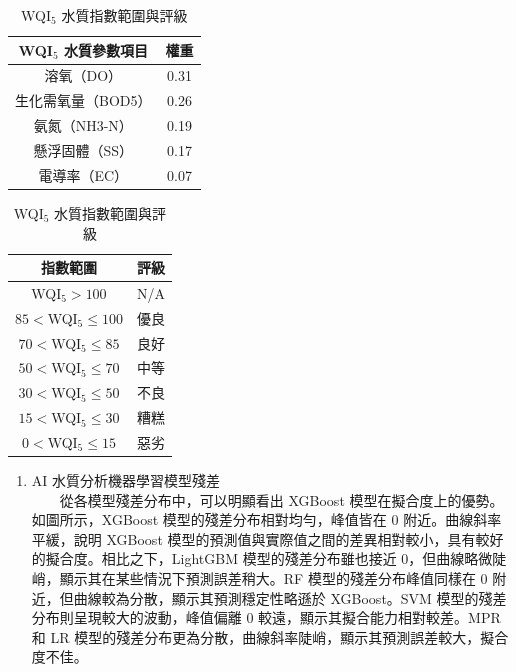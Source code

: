 \documentclass[12pt,a4paper]{article}
\begin{document}
\begin{enumerate}
\begin{enumerate}[label=\arabic*.]
\begin{enumerate}[label=3-2-\arabic*.]
\begin{table}[H]
\begin{minipage}{0.45\textwidth}
                    \begin{tabular}{cc}
                    \hline
                    WQI$_5$ 水質參數項目 & 權重 \\
                    \hline
                    溶氧（DO） & 0.31 \\
                    生化需氧量（BOD5） & 0.26 \\
                    氨氮（NH3-N） & 0.19 \\
                    懸浮固體（SS） & 0.17 \\
                    電導率（EC） & 0.07 \\
                    \hline
                    \end{tabular}
                    \label{table:wqi_weights}
                \end{minipage}
                \begin{minipage}{0.45\textwidth}
                    \centering
                    \caption{WQI$_5$ 水質指數範圍與評級}
                    \begin{tabular}{cc}
                    \hline
                    指數範圍 & 評級 \\
                    \hline
                    WQI$_5>100$ & N/A \\
                    $85<$WQI$_5\leq100$ & 優良 \\
                    $70<$WQI$_5\leq85$ & 良好 \\
                    $50<$WQI$_5\leq70$ & 中等 \\
                    $30<$WQI$_5\leq50$ & 不良 \\
                    $15<$WQI$_5\leq30$ & 糟糕 \\
                    $0<$WQI$_5\leq15$ & 惡劣 \\
                    \hline
                    \end{tabular}
                    \label{table:wqi_grades}
                \end{minipage}
            \end{table}
            \begin{enumerate}[label=\Alph*.]
                \item AI 水質分析機器學習模型殘差\\
                　　從各模型殘差分布中，可以明顯看出 XGBoost 模型在擬合度上的優勢。如圖所示，XGBoost 模型的殘差分布相對均勻，峰值皆在 0 附近。曲線斜率平緩，說明 XGBoost 模型的預測值與實際值之間的差異相對較小，具有較好的擬合度。相比之下，LightGBM 模型的殘差分布雖也接近 0，但曲線略微陡峭，顯示其在某些情況下預測誤差稍大。RF 模型的殘差分布峰值同樣在 0 附近，但曲線較為分散，顯示其預測穩定性略遜於 XGBoost。SVM 模型的殘差分布則呈現較大的波動，峰值偏離 0 較遠，顯示其擬合能力相對較差。MPR 和 LR 模型的殘差分布更為分散，曲線斜率陡峭，顯示其預測誤差較大，擬合度不佳。\\

\end{enumerate}
\end{enumerate}
\end{enumerate}
\end{enumerate}
\end{document}
